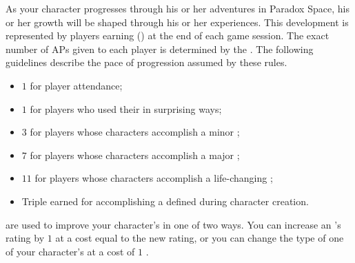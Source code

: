 As your character progresses through his or her adventures in Paradox Space, his or her growth will be shaped
through his or her experiences. This development is represented by players earning 
() at the end of each game session. The exact number of APs given to each player is determined by
the \GM. The following guidelines describe the pace of progression assumed by these rules.
\begin{itemize}
	\item $1$  for player attendance;
	\item $1$  for players who used their  in surprising ways;
	\item $3$  for players whose characters accomplish a minor ;
	\item $7$  for players whose characters accomplish a major ;
	\item $11$  for players whose characters accomplish a life-changing ;
	\item Triple  earned for accomplishing a  defined during character creation.
\end{itemize}

 are used to improve your character's  in one of two ways.
You can increase an 's rating by $1$ at a cost equal to the new rating, or you can change the
type of one of your character's  at a cost of $1$ .
